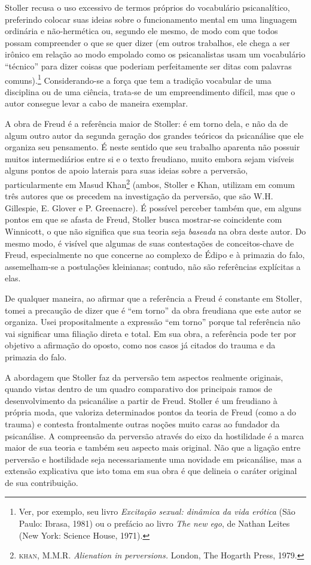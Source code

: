 Stoller recusa o uso excessivo de termos próprios do vocabulário
psicanalítico, preferindo colocar suas ideias sobre o funcionamento mental
em uma linguagem ordinária e não-hermética ou, segundo ele mesmo, de modo
com que todos possam compreender o que se quer dizer (em outros trabalhos,
ele chega a ser irônico em relação ao modo empolado como os psicanalistas
usam um vocabulário “técnico” para dizer coisas que poderiam perfeitamente
ser ditas com palavras comuns).\footnote{ Ver, por exemplo, seu livro
\textit{Excitação sexual: dinâmica da vida erótica} (São Paulo: Ibrasa,
1981) ou o prefácio ao livro \textit{The new ego}, de Nathan Leites (New
York: Science House, 1971).} Considerando-se a força que tem a tradição
vocabular de uma disciplina ou de uma ciência, trata-se de um
empreendimento difícil, mas que o autor consegue levar a cabo de maneira
exemplar.

A obra de Freud é a referência maior de Stoller: é em torno dela, e não da
de algum outro autor da segunda geração dos grandes teóricos da psicanálise
que ele organiza seu pensamento. É neste sentido que seu trabalho aparenta
não possuir muitos intermediários entre si e o texto freudiano, muito
embora sejam visíveis alguns pontos de apoio laterais para suas ideias
sobre a perversão, particularmente em Masud Khan\footnote{ \textsc{khan}, M.M.R.
\textit{Alienation in  perversions.} London, The Hogarth Press, 1979.}
(ambos, Stoller e Khan, utilizam em comum três autores que os precedem na
investigação da perversão, que são W.H. Gillespie, E. Glover e P.
Greenacre). É possível perceber também que, em alguns pontos em que se
afasta de Freud, Stoller busca mostrar-se coincidente com Winnicott, o que
não significa que sua teoria seja \textit{baseada} na obra deste autor. Do
mesmo modo, é visível que algumas de suas contestações de conceitos-chave
de Freud, especialmente no que concerne ao complexo de Édipo e à primazia
do falo, assemelham-se a postulações kleinianas; contudo, não são
referências explícitas a elas.

De qualquer maneira, ao afirmar que a referência a Freud é constante em
Stoller, tomei a precaução de dizer que é “em torno” da obra freudiana que
este autor se organiza. Usei propositalmente a expressão “em torno” porque
tal referência não vai significar uma filiação direta e total. Em sua obra,
a referência pode ter por objetivo a afirmação do oposto, como nos casos já
citados do trauma e da primazia do falo.

A abordagem que Stoller faz da perversão tem aspectos realmente originais,
quando vistas dentro de um quadro comparativo dos principais ramos de
desenvolvimento da psicanálise a partir de Freud. Stoller é um freudiano à
própria moda, que valoriza determinados pontos da teoria de Freud (como a
do trauma) e contesta frontalmente outras noções muito caras ao fundador da
psicanálise. A compreensão da perversão através do eixo da hostilidade é a
marca maior de sua teoria e também seu aspecto mais original. Não que a
ligação entre perversão e hostilidade seja necessariamente uma novidade em
psicanálise, mas a extensão explicativa que isto toma em sua obra é que
delineia o caráter original de sua contribuição.

